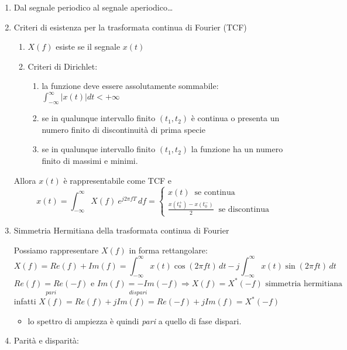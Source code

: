 \documentclass[
  paper=a4,
  ,captions=tableheading
]{scrartcl}
\providecommand{\tightlist}{%
  \setlength{\itemsep}{0pt}\setlength{\parskip}{0pt}}
\begin{document}
\begin{enumerate}
\def\labelenumi{\arabic{enumi}.}
\setcounter{enumi}{8}
\item
  Dal segnale periodico al segnale aperiodico\ldots{}
\item
  Criteri di esistenza per la trasformata continua di Fourier (TCF)

  \begin{enumerate}
  \def\labelenumii{\arabic{enumii}.}
  \tightlist
  \item
    \(X(f)\) esiste se il segnale \(x(t)\)
  \item
    Criteri di Dirichlet:

    \begin{enumerate}
    \def\labelenumiii{\arabic{enumiii}.}
    \tightlist
    \item
      la funzione deve essere assolutamente sommabile:
      \(\displaystyle \int_{-\infty}^{\infty} |x(t)| dt < +\infty\)
    \item
      se in qualunque intervallo finito \((t_1, t_2)\) è continua o
      presenta un numero finito di discontinuità di prima specie
    \item
      se in qualunque intervallo finito \((t_1, t_2)\) la funzione ha un
      numero finito di massimi e minimi.
    \end{enumerate}
  \end{enumerate}

  Allora \(x(t)\) è rappresentabile come TCF e \[
  x(t) = \int_{-\infty}^{\infty}X(f)\ e^{j2\pi fT} \,df =  \left\{ \begin{array}{cl}
  x(t) \ \text{ se continua}  \\
  \frac{x(t_{0}^{+})-x(t_{0}^{-})}{2}\ \text{ se discontinua}
  \end{array} \right.
  \]
\item
  Simmetria Hermitiana della trasformata continua di Fourier

  Possiamo rappresentare \(X(f)\) in forma rettangolare: \[
  X(f) = Re(f) + Im(f) = \int_{-\infty}^\infty x(t) \cos(2\pi ft) \,dt - j\int_{-\infty}^\infty x(t) \sin(2\pi ft) \,dt
  \] \[
  \underset{pari}{Re(f)=Re(-f)} \text{ e } \underset{dispari}{Im(f)=-Im(-f)} \Longrightarrow X(f)=X^{*}(-f) \text{ simmetria hermitiana}
  \] infatti \(X(f)=Re(f)+jIm(f)=Re(-f)+jIm(f)=X^{*}(-f)\)

  \begin{itemize}
  \tightlist
  \item
    lo spettro di ampiezza è quindi \emph{pari} a quello di fase
    dispari.
  \end{itemize}
\item
  Parità e disparità:


\end{enumerate}
\end{document}
